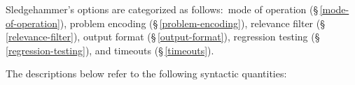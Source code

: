 \documentclass[a4paper,12pt]{article}
\let\oldS=\S
\def\S{\oldS\,}
\def\qtybf#1{$\mathbf{\left<\textbf{\textit{#1\/}}\right>}$}
\renewcommand\_{\hbox{\textunderscore\kern-.05ex}}
\begin{document}
\def\flushitem#1{\item[]\noindent\kern-\leftmargin \textbf{#1}}
\def\optrueonly#1{\flushitem{\textit{#1} $\bigl[$= \textit{true}$\bigr]$\enskip}\nopagebreak\\[\parskip]}
\def\optrue#1#2{\flushitem{\textit{#1} $\bigl[$= \qtybf{bool}$\bigr]$\enskip \defl\textit{true}\defr\hfill (neg.: \textit{#2})}\nopagebreak\\[\parskip]}
\def\opfalse#1#2{\flushitem{\textit{#1} $\bigl[$= \qtybf{bool}$\bigr]$\enskip \defl\textit{false}\defr\hfill (neg.: \textit{#2})}\nopagebreak\\[\parskip]}
\def\opsmart#1#2{\flushitem{\textit{#1} $\bigl[$= \qtybf{smart\_bool}$\bigr]$\enskip \defl\textit{smart}\defr\hfill (neg.: \textit{#2})}\nopagebreak\\[\parskip]}
\def\opsmartx#1#2{\flushitem{\textit{#1} $\bigl[$= \qtybf{smart\_bool}$\bigr]$\enskip \defl\textit{smart}\defr\\\hbox{}\hfill (neg.: \textit{#2})}\nopagebreak\\[\parskip]}
\def\opnodefault#1#2{\flushitem{\textit{#1} = \qtybf{#2}} \nopagebreak\\[\parskip]}
\def\opnodefaultbrk#1#2{\flushitem{$\bigl[$\textit{#1} =$\bigr]$ \qtybf{#2}} \nopagebreak\\[\parskip]}
\def\opdefault#1#2#3{\flushitem{\textit{#1} = \qtybf{#2}\enskip \defl\textit{#3}\defr} \nopagebreak\\[\parskip]}
\def\oparg#1#2#3{\flushitem{\textit{#1} \qtybf{#2} = \qtybf{#3}} \nopagebreak\\[\parskip]}
\def\opargbool#1#2#3{\flushitem{\textit{#1} \qtybf{#2} $\bigl[$= \qtybf{bool}$\bigr]$\hfill (neg.: \textit{#3})}\nopagebreak\\[\parskip]}
\def\opargboolorsmart#1#2#3{\flushitem{\textit{#1} \qtybf{#2} $\bigl[$= \qtybf{smart\_bool}$\bigr]$\hfill (neg.: \textit{#3})}\nopagebreak\\[\parskip]}

Sledgehammer's options are categorized as follows:\ mode of operation
(\S\ref{mode-of-operation}), problem encoding (\S\ref{problem-encoding}),
relevance filter (\S\ref{relevance-filter}), output format
(\S\ref{output-format}), regression testing (\S\ref{regression-testing}),
and timeouts (\S\ref{timeouts}).

The descriptions below refer to the following syntactic quantities:
\end{document}

